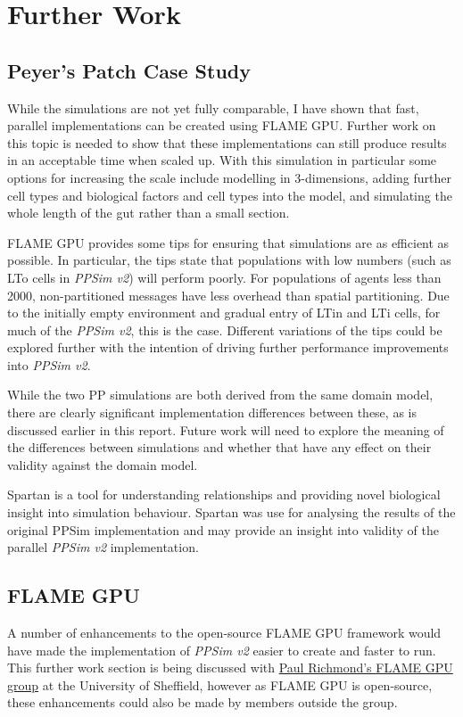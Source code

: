 \documentclass{UoYCSproject}
\begin{document}
\section{Further Work}
\subsection{Peyer's Patch Case Study}
While the simulations are not yet fully comparable, I have shown that fast, parallel implementations can be created using \gls{FLAME GPU}.
Further work on this topic is needed to show that these implementations can still produce results in an acceptable time when scaled up.
With this simulation in particular some options for increasing the scale include modelling in 3-dimensions, adding further cell types and biological factors and cell types into the model, and simulating the whole length of the gut rather than a small section.

\gls{FLAME GPU} provides some tips for ensuring that simulations are as efficient as possible\cite[p.37]{flame_doc}.
In particular, the tips state that populations with low numbers (such as \gls{LTo} cells in \textit{PPSim v2}) will perform poorly.
For populations of agents less than 2000, non-partitioned messages have less overhead than spatial partitioning.
Due to the initially empty environment and gradual entry of \gls{LTin} and \gls{LTi} cells, for much of the \textit{PPSim v2}, this is the case.
Different variations of the tips could be explored further with the intention of driving further performance improvements into \textit{PPSim v2}.

While the two \gls{PP} simulations are both derived from the same domain model, there are clearly significant implementation differences between these, as is discussed earlier in this report.
Future work will need to explore the meaning of the differences between simulations and whether that have any effect on their validity against the domain model.

Spartan is a tool for understanding relationships and providing novel biological insight into simulation behaviour.
Spartan was use for analysing the results of the original PPSim implementation \cite{spartan} and may provide an insight into validity of the parallel \textit{PPSim v2} implementation.

\subsection{\gls{FLAME GPU}}
\label{flame_further_work}
A number of enhancements to the open-source \gls{FLAME GPU} framework would have made the implementation of \textit{PPSim v2} easier to create and faster to run.
This further work section is being discussed with \href{http://paulrichmond.shef.ac.uk/gpu/gpucomputingatsheffield/}{Paul Richmond's \gls{FLAME GPU} group} at the University of Sheffield, however as \gls{FLAME GPU} is open-source, these enhancements could also be made by members outside the group.
\end{document}
